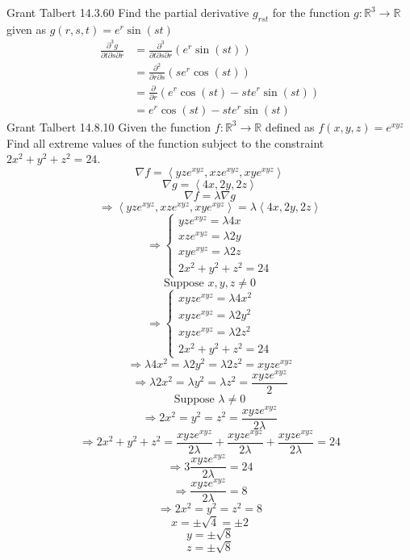 \documentclass[12pt, letterpaper]{report}
\begin{document}
Grant Talbert 14.3.60
Find the partial derivative \(g_{rst} \) for the function \(g:\mathbb{R} ^3\to \mathbb{R} \) given as
\(\displaystyle g(r,s,t)=e^r \sin (st)\)
\begin{align*}
    \frac{\partial ^3 g}{\partial t \partial s \partial r}&= \frac{\partial^3 }{\partial t\partial s \partial r}\left( e^r \sin (st) \right) \\
    &=\frac{\partial^2 }{\partial r \partial s}\left( se^r \cos (st) \right)\\
    &=\frac{\partial }{\partial r}\left( e^r \cos (st)-st e^r \sin (st) \right)\\
    &= e^r \cos (st)-st e^r \sin (st)
\end{align*}
\newpage
Grant Talbert 14.8.10
Given the function \(\displaystyle f:\mathbb{R} ^3\to \mathbb{R} \) defined as
\(\displaystyle f(x,y,z)=e^{xyz} \)
Find all extreme values of the function subject to the constraint \(\displaystyle 2x^2 +y^2 +z^2 =24\).\\
\[
    \nabla f =\left\langle yze^{xyz},xze^{xyz},xye^{xyz}    \right\rangle
\]
\[
    \nabla g=\left\langle 4x,2y,2z \right\rangle 
\]
\[
    \nabla f=\lambda \nabla g
\]
\[
    \Longrightarrow \left\langle yze^{xyz},xze^{xyz},xye^{xyz}    \right\rangle=\lambda \left\langle 4x,2y,2z \right\rangle
\]
\[
    \Longrightarrow \left\{\begin{array}{c}
        yze^{xyz}= \lambda 4x\\
        xze^{xyz}=\lambda 2y\\
        xye^{xyz}=\lambda 2z\\
        2x^2 +y^2 +z^2=24
    \end{array}\right.
\]
\[
    \text{Suppose } x,y,z\neq  0 
\]
\[
    \Longrightarrow \left\{\begin{array}{c}
        xyze^{xyz}= \lambda 4x^2\\
        xyze^{xyz}=\lambda 2y^2\\
        xyze^{xyz}=\lambda 2z^2\\
        2x^2 +y^2 +z^2=24
    \end{array}\right.
\]
\[
    \Longrightarrow \lambda 4x^2 =\lambda 2y^2=\lambda 2z^2=xyze^{xyz} 
\]
\[
    \Longrightarrow \lambda 2x^2 =\lambda y^2=\lambda z^2=\frac{xyze^{xyz} }{2}
\]
\[
    \text{Suppose }\lambda \neq 0 
\]
\[
    \Longrightarrow 2x^2=y^2=z^2=\frac{xyze^{xyz} }{2\lambda }
\]
\[ 
    \Longrightarrow 2x^2 +y^2 +z^2 =\frac{xyze^{xyz} }{2\lambda }+\frac{xyze^{xyz} }{2\lambda }+\frac{xyze^{xyz} }{2\lambda }=24
\]
\[
    \Longrightarrow 3\frac{xyze^{xyz} }{2\lambda }=24
\]
\[
    \Longrightarrow \frac{xyze^{xyz} }{2\lambda }=8
\]
\[
    \Longrightarrow 2x^2=y^2=z^2=8
\]
\[
    x=\pm\sqrt{4}=\pm 2 
\]
\[
    y=\pm\sqrt{8} 
\]
\[
    z=\pm\sqrt{8} 
\]
\end{document}
